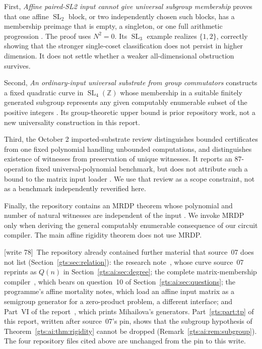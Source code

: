 \documentclass[11pt,letterpaper]{article}
\theoremstyle{definition}
\theoremstyle{remark}
\newcommand{\Z}{\mathbb Z}
\newcommand{\SL}{\operatorname{SL}}
\newcommand{\wtagb}{\textup{[write 78]}}
\begin{document}
First, \emph{Affine paired-SL2 input cannot give universal subgroup membership} proves that one affine $\SL_2$ block, or two independently chosen such blocks, has a membership preimage that is empty, a singleton, or one full arithmetic progression \cite{ai-repoaffine}. The proof uses $N^2=0$. Its $\SL_3$ example realizes $\{1,2\}$, correctly showing that the stronger single-coset classification does not persist in higher dimension. It does not settle whether a weaker all-dimensional obstruction survives.

Second, \emph{An ordinary-input universal substrate from group commutators} constructs a fixed quadratic curve in $\SL_4(\Z)$ whose membership in a suitable finitely generated subgroup represents any given computably enumerable subset of the positive integers \cite{ai-repoquadratic}. Its group-theoretic upper bound is prior repository work, not a new universality construction in this report.

Third, the October 2 imported-substrate review distinguishes bounded certificates from one fixed polynomial handling unbounded computations, and distinguishes existence of witnesses from preservation of unique witnesses. It reports an 87-operation fixed universal-polynomial benchmark, but does not attribute such a bound to the matrix input loader \cite{ai-repoaudit}. We use that review as a scope constraint, not as a benchmark independently reverified here.

Finally, the repository contains an MRDP theorem whose polynomial and number of natural witnesses are independent of the input \cite{ai-repomrdp}. We invoke MRDP only when deriving the general computably enumerable consequence of our circuit compiler. The main affine rigidity theorem does not use MRDP.

\wtagb\ The repository already contained further material that source~07 does not list (Section~\ref{gts:sec:relation}): the research note~\cite{repo-unip}, whose curve source~07 reprints as $Q(n)$ in Section~\ref{gts:ai:sec:degree}; the complete matrix-membership compiler~\cite{repo-cmc}, which bears on question~10 of Section~\ref{gts:ai:sec:questions}; the programme's affine mortality notes, which load an affine input matrix as a semigroup generator for a zero-product problem, a different interface; and Part~VI of the report~\cite{pqc}, which prints Mihailova's generators. Part~\ref{gts:part:tp} of this report, written after source~07's pin, shows that the subgroup hypothesis of Theorem~\ref{gts:ai:thm:rigidity} cannot be dropped (Remark~\ref{gts:ai:rem:subgroup}). The four repository files cited above are unchanged from the pin to this write.
\end{document}
